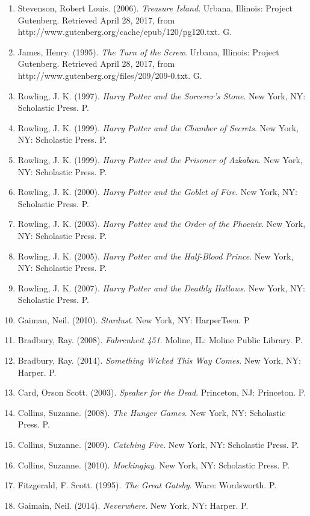 \documentclass[11pt,a4paper]{article}
\begin{document}
\begin{enumerate}
   \item Stevenson, Robert Louis. (2006). \textit{Treasure Island}. Urbana, Illinois: Project Gutenberg. Retrieved April 28, 2017, from http://www.gutenberg.org/cache/epub/120/pg120.txt. G.
   \item James, Henry. (1995). \textit{The Turn of the Screw}. Urbana, Illinois: Project Gutenberg. Retrieved April 28, 2017, from http://www.gutenberg.org/files/209/209-0.txt. G.
   \item Rowling, J. K. (1997). \textit{Harry Potter and the Sorcerer's Stone}. New York, NY: Scholastic Press. P.
   \item Rowling, J. K. (1999). \textit{Harry Potter and the Chamber of Secrets}. New York, NY: Scholastic Press. P.
   \item Rowling, J. K. (1999). \textit{Harry Potter and the Prisoner of Azkaban}. New York, NY: Scholastic Press. P.
   \item Rowling, J. K. (2000). \textit{Harry Potter and the Goblet of Fire}. New York, NY: Scholastic Press. P.
   \item Rowling, J. K. (2003). \textit{Harry Potter and the Order of the Phoenix}. New York, NY: Scholastic Press. P.
   \item Rowling, J. K. (2005). \textit{Harry Potter and the Half-Blood Prince}. New York, NY: Scholastic Press. P.
   \item Rowling, J. K. (2007). \textit{Harry Potter and the Deathly Hallows}. New York, NY: Scholastic Press. P.
   \item Gaiman, Neil. (2010). \textit{Stardust}. New York, NY: HarperTeen. P
   \item Bradbury, Ray. (2008). \textit{Fahrenheit 451}. Moline, IL: Moline Public Library. P.
   \item Bradbury, Ray. (2014). \textit{Something Wicked This Way Comes}. New York, NY: Harper. P.
   \item Card, Orson Scott. (2003). \textit{Speaker for the Dead}. Princeton, NJ: Princeton. P.
   \item Collins, Suzanne. (2008). \textit{The Hunger Games}. New York, NY: Scholastic Press. P.
   \item Collins, Suzanne. (2009). \textit{Catching Fire}. New York, NY: Scholastic Press. P.
   \item Collins, Suzanne. (2010). \textit{Mockingjay}. New York, NY: Scholastic Press. P.
   \item Fitzgerald, F. Scott. (1995). \textit{The Great Gatsby}. Ware: Wordsworth. P.
   \item Gaimain, Neil. (2014). \textit{Neverwhere}. New York, NY: Harper. P.

\end{enumerate}
\end{document}

